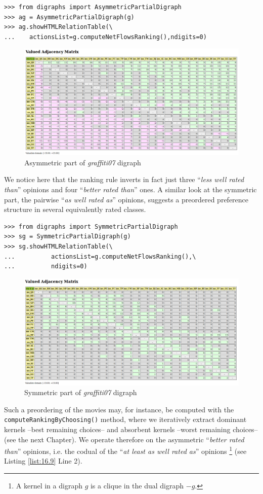 \begin{lstlisting}
>>> from digraphs import AsymmetricPartialDigraph
>>> ag = AsymmetricPartialDigraph(g)
>>> ag.showHTMLRelationTable(\
...    actionsList=g.computeNetFlowsRanking(),ndigits=0)
\end{lstlisting}
\begin{figure}[h]
\includegraphics[width=12cm]{Figures/asymmetricPart.png}
\caption{Asymmetric part of \emph{graffiti07} digraph}
\label{fig:16.8}       %
\end{figure}
We notice here that the \NetFlows ranking rule inverts in fact just three ``\emph{less well rated than}'' opinions and four ``\emph{better rated than}'' ones. A similar look at the symmetric part, the pairwise ``\emph{as well rated as}'' opinions, suggests a preordered preference structure in several equivalently rated classes.

\begin{lstlisting}
>>> from digraphs import SymmetricPartialDigraph
>>> sg = SymmetricPartialDigraph(g)
>>> sg.showHTMLRelationTable(\
...          actionsList=g.computeNetFlowsRanking(),\
...          ndigits=0)
\end{lstlisting}
\begin{figure}[h]
\includegraphics[width=12cm]{Figures/symmetricPart.png}
\caption{Symmetric part of \emph{graffiti07} digraph}
\label{fig:16.9}       %
\end{figure}
Such a preordering of the movies may, for instance, be computed with the \texttt{computeRankingByChoosing()} method, where we iteratively extract dominant kernels --best remaining choices-- and absorbent kernels --worst remaining choices-- (see the next Chapter). We operate therefore on the asymmetric ``\emph{better rated than}'' opinions, i.e. the codual of the ``\emph{at least as well rated as}'' opinions \footnote{A kernel in a digraph $g$ is a clique in the dual digraph $-g$.} (see Listing \ref{list:16.9} Line 2).


